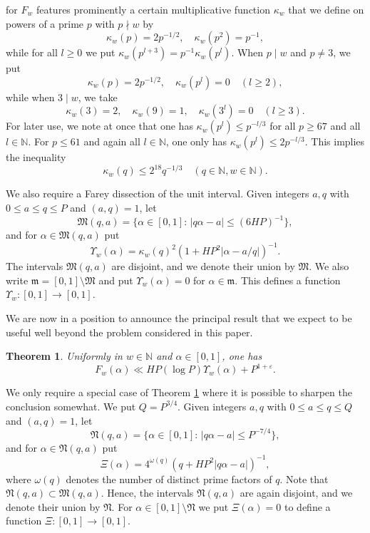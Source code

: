 \documentclass[reqno]{amsart}
\newcommand\NN{{\mathbb N}}
\newcommand\Ups{\Upsilon}
\newtheorem{thm}{Theorem}[section]
\numberwithin{equation}{section}
\begin{document}
for $F_w$ features prominently a certain multiplicative function $\kappa_w$ that we define
on powers of a prime $p$ with $p\nmid w$ by
$$ \kappa_w(p) = 2p^{-1/2},\quad \kappa_w(p^2)= p^{-1}, $$
while for all $l\ge 0$ we put $\kappa_w(p^{l+3}) = p^{-1}\kappa_w(p^l)$. When $p\mid w$  and $p\neq 3$, we put
$$ \kappa_w(p) = 2p^{-1/2},\quad \kappa_w(p^l)= 0 \quad (l\ge 2),$$
while when $3\mid w$, we take
$$ \kappa_w(3)= 2, \quad \kappa_w(9) = 1, \quad  \kappa_w(3^l)= 0 \quad (l\ge 3).$$
For later use, we note at once that one has $\kappa_w(p^l) \le p^{-l/3}$ for all $p\ge 67$ and all $l\in\NN$. For $p\le 61$ and again all $l\in\NN$, one only has $\kappa_w(p^l) \le 2p^{-l/3}$.
This implies  the inequality
\begin{equation}\label{kapp} \kappa_w(q) \le 2^{18} q^{-1/3}\quad (q\in\NN, w\in\NN). \end{equation}

 
We also require a Farey dissection of the unit interval.
Given integers $a,q$ with $0\le a\le q\le P$ and $(a,q)=1$, let
$$ \mathfrak M(q,a)= \{\alpha\in[0,1]:\, |q\alpha-a|\le (6HP)^{-1}\}, $$
and for $\alpha\in\mathfrak M(q,a)$ put
$$ \Ups_w(\alpha) = \kappa_w(q)^2 (1+HP^2|\alpha-a/q|)^{-1}.$$
The intervals $\mathfrak M(q,a)$ are disjoint, and we denote their union by $\mathfrak M$. We also write $\mathfrak m= [0,1]\setminus \mathfrak M$ and put $\Ups_w(\alpha)=0$ for $\alpha\in\mathfrak m$. This defines a function $\Ups_w: [0,1]\to [0,1]$. 

We are now in a position to announce the principal result that we expect to be useful well beyond the problem considered in this paper. 

\begin{thm}\label{thm31} Uniformly in $w\in\mathbb N$ and $\alpha\in[0,1]$, one has
$$ F_w(\alpha) \ll HP(\log P)\Ups_w(\alpha) + P^{1+\varepsilon}. $$
\end{thm}

We only require a special case of Theorem \ref{thm31} where it is possible to sharpen the conclusion somewhat. We put $Q=P^{3/4}$.
Given integers $a,q$ with $0\le a\le q\le Q$ and $(a,q)=1$, let
$$ \mathfrak N(q,a)= \{\alpha\in[0,1]:\, |q\alpha-a|\le P^{-7/4}\}, $$
and for $\alpha\in\mathfrak N(q,a)$ put
$$ \Xi(\alpha) = 4^{\omega(q)}(q+HP^2|q\alpha-a|)^{-1},$$
where $\omega(q)$ denotes the number of distinct prime factors of $q$.
Note that $\mathfrak N(q,a)\subset\mathfrak M(q,a)$. Hence, 
the intervals $\mathfrak N(q,a)$ are again disjoint, and we denote their union by $\mathfrak N$. For $\alpha\in [0,1]\setminus \mathfrak N$ we put $\Xi(\alpha)=0$ to define a function $\Xi: [0,1]\to [0,1]$.
\end{document}
